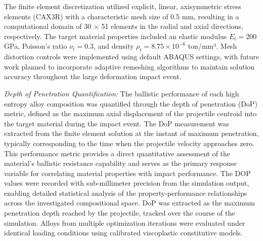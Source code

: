 The finite element discretization utilized explicit, linear, axisymmetric stress elements (CAX3R) with a characteristic mesh size of 0.5 mm, resulting in a computational domain of 30 × 51 elements in the radial and axial directions, respectively. The target material properties included an elastic modulus $E_t = 200$ GPa, Poisson's ratio $\nu_t = 0.3$, and density $\rho_t = 8.75 \times 10^{-6}$ ton/mm³. Mesh distortion controls were implemented using default ABAQUS settings, with future work planned to incorporate adaptive remeshing algorithms to maintain solution accuracy throughout the large deformation impact event.

\emph{Depth of Penetration Quantification:} The ballistic performance of each high entropy alloy composition was quantified through the depth of penetration (DoP) metric, defined as the maximum axial displacement of the projectile centroid into the target material during the impact event. The DoP measurement was extracted from the finite element solution at the instant of maximum penetration, typically corresponding to the time when the projectile velocity approaches zero. This performance metric provides a direct quantitative assessment of the material's ballistic resistance capability and serves as the primary response variable for correlating material properties with impact performance. The DOP values were recorded with sub-millimeter precision from the simulation output, enabling detailed statistical analysis of the property-performance relationships across the investigated compositional space. DoP was extracted as the maximum penetration depth reached by the projectile, tracked over the course of the simulation. Alloys from multiple optimization iterations were evaluated under identical loading conditions using calibrated viscoplastic constitutive models.




